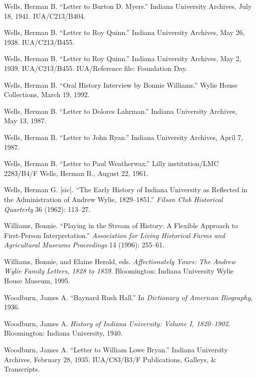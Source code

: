 \documentclass[
  american,
  letterpaper,
]{scrreprt}
\newlength{\cslhangindent}
\newenvironment{CSLReferences}[2] %
 {\begin{list}{}{%
  \setlength{\itemindent}{0pt}
  \setlength{\leftmargin}{0pt}
  \setlength{\parsep}{0pt}
  \ifodd #1
   \setlength{\leftmargin}{\cslhangindent}
   \setlength{\itemindent}{-1\cslhangindent}
  \fi
  \setlength{\itemsep}{#2\baselineskip}}}
 {\end{list}}
\begin{document}
\begin{CSLReferences}{1}{0}
Wells, Herman B. {``Letter to Burton {D.} Myers.''} Indiana University
Archives, July 18, 1941. IUA/C213/B404.

Wells, Herman B. {``Letter to Roy Quinn.''} Indiana University Archives,
May 26, 1938. IUA/C213/B455.

Wells, Herman B. {``Letter to Roy Quinn.''} Indiana University Archives,
May 2, 1939. IUA/C213/B455. IUA/Reference file: Foundation Day.

Wells, Herman B. {``Oral History Interview by Bonnie Williams.''} Wylie
House Collections, March 19, 1992.

Wells, Herman B. {``Letter to Dolores Lahrman.''} Indiana University
Archives, May 13, 1987.

Wells, Herman B. {``Letter to John Ryan.''} Indiana University Archives,
April 7, 1987.

Wells, Herman B. {``Letter to Paul Weatherwax.''} Lilly institution/LMC
2283/B4/F Wells, Herman B., August 22, 1961.

Wells, Herman G. {[}sic{]}. {``The Early History of Indiana University
as Reflected in the Administration of Andrew Wylie, 1829--1851.''}
\emph{Filson Club Historical Quarterly} 36 (1962): 113--27.

Williams, Bonnie. {``Playing in the Stream of History: A Flexible
Approach to First-Person Interpretation.''} \emph{Association for Living
Historical Farms and Agricultural Museums Proceedings} 14 (1996):
255--61.

Williams, Bonnie, and Elaine Herold, eds. \emph{Affectionately Yours:
The Andrew Wylie Family Letters, 1828 to 1859}. Bloomington: Indiana
University Wylie House Museum, 1995.

Woodburn, James A. {``Baynard Rush Hall.''} In \emph{Dictionary of
American Biography}, 1936.

Woodburn, James A. \emph{History of Indiana University: Volume {I},
1820--1902}. Bloomington: Indiana University, 1940.

Woodburn, James A. {``Letter to William Lowe Bryan.''} Indiana
University Archives, February 28, 1935. IUA/C83/B3/F Publications,
Galleys, \& Transcripts.


\end{CSLReferences}
\end{document}
